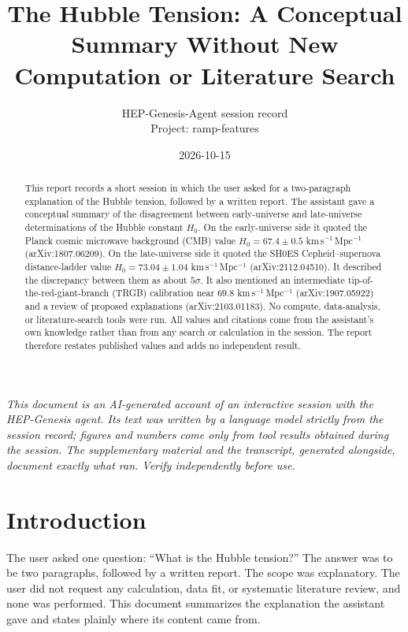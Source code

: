 \documentclass[11pt,a4paper]{article}
\title{The Hubble Tension: A Conceptual Summary Without New Computation or Literature Search}
\author{HEP-Genesis-Agent session record \\ \small Project: ramp-features}
\date{2026-10-15}
\begin{document}
\maketitle
\noindent\textit{\small This document is an AI-generated account of an interactive session with the HEP-Genesis agent. Its text was written by a language model strictly from the session record; figures and numbers come only from tool results obtained during the session. The supplementary material and the transcript, generated alongside, document exactly what ran. Verify independently before use.}
\vspace{1em}

\begin{abstract}
This report records a short session in which the user asked for a two-paragraph explanation of the Hubble tension, followed by a written report. The assistant gave a conceptual summary of the disagreement between early-universe and late-universe determinations of the Hubble constant $H_0$. On the early-universe side it quoted the Planck cosmic microwave background (CMB) value $H_0 = 67.4 \pm 0.5$ km\,s$^{-1}$\,Mpc$^{-1}$ (arXiv:1807.06209). On the late-universe side it quoted the SH0ES Cepheid--supernova distance-ladder value $H_0 = 73.04 \pm 1.04$ km\,s$^{-1}$\,Mpc$^{-1}$ (arXiv:2112.04510). It described the discrepancy between them as about $5\sigma$. It also mentioned an intermediate tip-of-the-red-giant-branch (TRGB) calibration near $69.8$ km\,s$^{-1}$\,Mpc$^{-1}$ (arXiv:1907.05922) and a review of proposed explanations (arXiv:2103.01183). No compute, data-analysis, or literature-search tools were run. All values and citations come from the assistant's own knowledge rather than from any search or calculation in the session. The report therefore restates published values and adds no independent result.
\end{abstract}

\section{Introduction}
The user asked one question: ``What is the Hubble tension?'' The answer was to be two paragraphs, followed by a written report. The scope was explanatory. The user did not request any calculation, data fit, or systematic literature review, and none was performed. This document summarizes the explanation the assistant gave and states plainly where its content came from.
\end{document}
